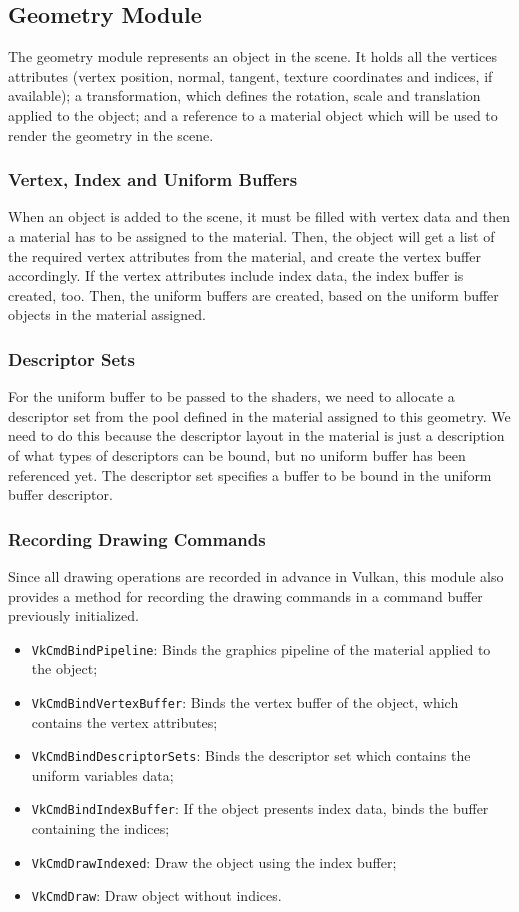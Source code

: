 \subsection{Geometry Module}
The geometry module represents an object in the scene. It holds all the vertices attributes (vertex position, normal, tangent, texture coordinates and indices, if available); a transformation, which defines the rotation, scale and translation applied to the object; and a reference to a material object which will be used to render the geometry in the scene.

\subsubsection{Vertex, Index and Uniform Buffers}
When an object is added to the scene, it must be filled with vertex data and then a material has to be assigned to the material. Then, the object will get a list of the required vertex attributes from the material, and create the vertex buffer accordingly. If the vertex attributes include index data, the index buffer is created, too. Then, the uniform buffers are created, based on the uniform buffer objects in the material assigned.

\subsubsection{Descriptor Sets}
For the uniform buffer to be passed to the shaders, we need to allocate a descriptor set from the pool defined in the material assigned to this geometry. We need to do this because the descriptor layout in the material is just a description of what types of descriptors can be bound, but no uniform buffer has been referenced yet. The descriptor set specifies a buffer to be bound in the uniform buffer descriptor.

\subsubsection{Recording Drawing Commands}
Since all drawing operations are recorded in advance in Vulkan, this module also provides a method for recording the drawing commands in a command buffer previously initialized.

\begin{itemize}
    \item \texttt{VkCmdBindPipeline}: Binds the graphics pipeline of the material applied to the object;
    \item \texttt{VkCmdBindVertexBuffer}: Binds the vertex buffer of the object, which contains the vertex attributes;
    \item \texttt{VkCmdBindDescriptorSets}: Binds the descriptor set which contains the uniform variables data;
    \item \texttt{VkCmdBindIndexBuffer}: If the object presents index data, binds the buffer containing the indices;
    \item \texttt{VkCmdDrawIndexed}: Draw the object using the index buffer;
    \item \texttt{VkCmdDraw}: Draw object without indices.
\end{itemize}

